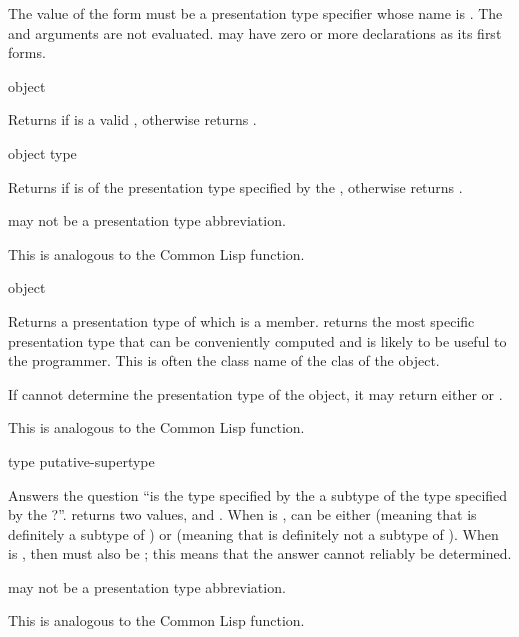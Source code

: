 The value of the form  must be a presentation type specifier whose
name is .  The  and  arguments are not
evaluated.   may have zero or more declarations as its first forms.


 {object}

Returns  if  is a valid , otherwise returns .


 {object type}

Returns  if  is of the presentation type specified by the
 , otherwise returns .

 may not be a presentation type abbreviation.

This is analogous to the Common Lisp  function.


 {object}

Returns a presentation type of which  is a member.
 returns the most specific presentation type that can
be conveniently computed and is likely to be useful to the programmer.  This is
often the class name of the clas of the object.

If  cannot determine the presentation type of the
object, it may return either  or .

This is analogous to the Common Lisp  function.


 {type putative-supertype}

Answers the question ``is the type specified by the   a subtype of the type specified by the  ?''.   returns
two values,  and .  When  is
,  can be either  (meaning that 
is definitely a subtype of ) or  (meaning
that  is definitely not a subtype of ).  When
 is , then  must also be ;
this means that the answer cannot reliably be determined.

 may not be a presentation type abbreviation.

This is analogous to the Common Lisp  function.


